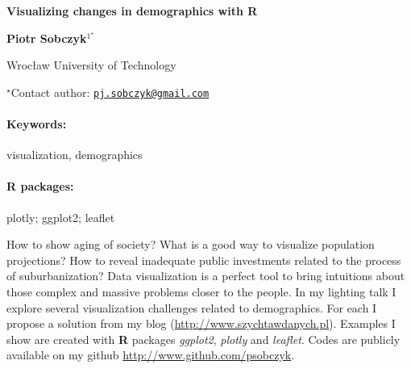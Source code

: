 \documentclass[11pt, a4paper]{article}
\renewcommand{\title}[1]{\begin{center}{\bf \LARGE #1}\end{center}}
\newcommand{\keywords}{\paragraph{Keywords:}}
\newcommand{\packages}{\paragraph{R packages:}}
\begin{document}
\pagestyle{empty}

\title{Visualizing changes in demographics with R}

\begin{center}
  {\bf Piotr Sobczyk$^{1^\star}$}
\end{center}

\vskip 0.3cm

\begin{affiliations}
\begin{enumerate}
\begin{minipage}{0.915\textwidth}
\centering
\item Wrocław University of Technology \\[-2pt]
\end{minipage}
\end{enumerate}
$^\star$Contact author: \href{mailto:pj.sobczyk@gmail.com}{\nolinkurl{pj.sobczyk@gmail.com}}\\
\end{affiliations}

\vskip 0.5cm

\begin{minipage}{0.915\textwidth}
\keywords visualization, demographics
\packages plotly; ggplot2; leaflet
\end{minipage}

\vskip 0.8cm

How to show aging of society? What is a good way to visualize population
projections? How to reveal inadequate public investments related to the
process of suburbanization? Data visualization is a perfect tool to
bring intuitions about those complex and massive problems closer to the
people. In my lighting talk I explore several visualization challenges
related to demographics. For each I propose a solution from my blog
(\url{http://www.szychtawdanych.pl}). Examples I show are created with
\textbf{R} packages \emph{ggplot2}, \emph{plotly} and \emph{leaflet}.
Codes are publicly available on my github
\url{http://www.github.com/psobczyk}.
\end{document}
